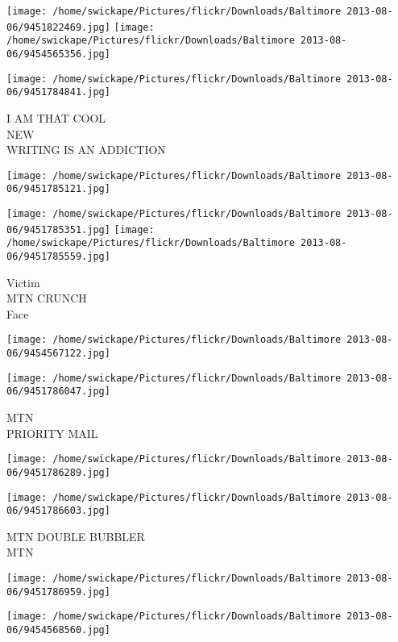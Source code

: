 \documentclass[10pt,letterpaper]{article}
\begin{document}
\texttt{[image: /home/swickape/Pictures/flickr/Downloads/Baltimore 2013-08-06/9451822469.jpg]}
\texttt{[image: /home/swickape/Pictures/flickr/Downloads/Baltimore 2013-08-06/9454565356.jpg]}

\texttt{[image: /home/swickape/Pictures/flickr/Downloads/Baltimore 2013-08-06/9451784841.jpg]}

I AM THAT COOL\\
NEW\\
WRITING IS AN ADDICTION\\
\pagebreak

\texttt{[image: /home/swickape/Pictures/flickr/Downloads/Baltimore 2013-08-06/9451785121.jpg]}

\vspace{0.25in}
\texttt{[image: /home/swickape/Pictures/flickr/Downloads/Baltimore 2013-08-06/9451785351.jpg]}
\texttt{[image: /home/swickape/Pictures/flickr/Downloads/Baltimore 2013-08-06/9451785559.jpg]}

Victim\\
MTN CRUNCH\\
Face\\
\pagebreak

\texttt{[image: /home/swickape/Pictures/flickr/Downloads/Baltimore 2013-08-06/9454567122.jpg]}

\vspace{0.25in}
\texttt{[image: /home/swickape/Pictures/flickr/Downloads/Baltimore 2013-08-06/9451786047.jpg]}

MTN\\
PRIORITY MAIL\\
\pagebreak

\texttt{[image: /home/swickape/Pictures/flickr/Downloads/Baltimore 2013-08-06/9451786289.jpg]}

\vspace{0.25in}
\texttt{[image: /home/swickape/Pictures/flickr/Downloads/Baltimore 2013-08-06/9451786603.jpg]}

MTN DOUBLE BUBBLER\\
MTN\\
\pagebreak

\texttt{[image: /home/swickape/Pictures/flickr/Downloads/Baltimore 2013-08-06/9451786959.jpg]}

\vspace{0.25in}
\texttt{[image: /home/swickape/Pictures/flickr/Downloads/Baltimore 2013-08-06/9454568560.jpg]}
\end{document}
